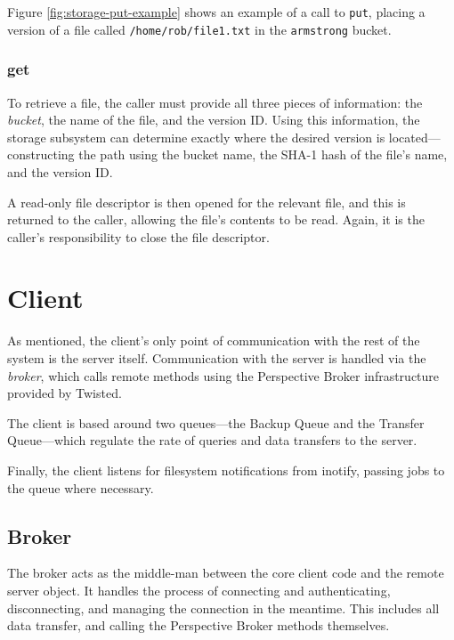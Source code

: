 Figure \ref{fig:storage-put-example} shows an example of a call to \verb!put!,
placing a version of a file called \verb!/home/rob/file1.txt! in the
\verb!armstrong! bucket.

\subsubsection{get}
\label{sec:implementation-server-storage-get}

To retrieve a file, the caller must provide all three pieces of information:
the \emph{bucket}, the name of the file, and the version ID. Using this
information, the storage subsystem can determine exactly where the desired
version is located---constructing the path using the bucket name, the SHA-1
hash of the file's name, and the version ID.

A read-only file descriptor is then opened for the relevant file, and this is
returned to the caller, allowing the file's contents to be read. Again, it is
the caller's responsibility to close the file descriptor.

\section{Client}
\label{sec:implementation-client}

As mentioned, the client's only point of communication with the rest of the
system is the server itself. Communication with the server is handled via the
\emph{broker}, which calls remote methods using the Perspective Broker
infrastructure provided by Twisted.

The client is based around two queues---the Backup Queue and the Transfer
Queue---which regulate the rate of queries and data transfers to the server.

Finally, the client listens for filesystem notifications from inotify, passing
jobs to the queue where necessary.

\subsection{Broker}
\label{sec:implementation-client-broker}

The broker acts as the middle-man between the core client code and the remote
server object. It handles the process of connecting and authenticating,
disconnecting, and managing the connection in the meantime. This includes all
data transfer, and calling the Perspective Broker methods themselves.

